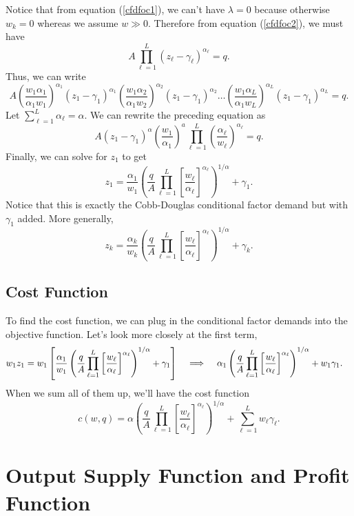 \documentclass[12pt]{article}
\newcommand{\Lindent}{\hspace{.4cm} \Longrightarrow \hspace{.4cm}}
\theoremstyle{definition}
\begin{document}
Notice that from equation (\ref{cfdfoc1}), we can't have $\lambda=0$ because otherwise $w_k=0$ whereas we assume $w \gg 0$.  Therefore from equation (\ref{cfdfoc2}), we must have
	\[	A \prod_{\ell = 1}^{L} (z_{\ell} - \gamma_{\ell})^{\alpha_{\ell}} = q. \]
Thus, we can write
	\[A \left(\frac{w_1 \alpha_1}{\alpha_1 w_1} \right)^{\alpha_1}(z_1  - \gamma_1)^{\alpha_1}\left( \frac{ w_1 \alpha_2}{\alpha_1 w_2} \right)^{\alpha_2}(z_1  - \gamma_1)^{\alpha_2} \hdots \left( \frac{ w_1 \alpha_L}{\alpha_1 w_L} \right)^{\alpha_L}(z_1  - \gamma_1)^{\alpha_L} = q.	\]
Let $\sum_{\ell=1}^L \alpha_{\ell} = \alpha$. We can rewrite the preceding equation as
	\[A (z_1 - \gamma_1)^{\alpha} \left( \frac{w_1}{\alpha_1} \right)^a \prod_{\ell=1}^L \left(\frac{\alpha_{\ell}}{w_{\ell}}\right)^{\alpha_{\ell}} = q.	\]
Finally, we can solve for $z_1$ to get 
	\[ z_1 =   \frac{\alpha_1}{w_1} \left(\frac{q}{A}  \prod_{\ell=1}^L \left[\frac{w_{\ell}}{\alpha_{\ell}}\right]^{\alpha_{\ell}}\right)^{1 / \alpha} + \gamma_1. \]
Notice that this is exactly the Cobb-Douglas conditional factor demand but with $\gamma_1$ added. More generally,
	\[ z_k =   \frac{\alpha_k}{w_k} \left(\frac{q}{A}  \prod_{\ell=1}^L \left[\frac{w_{\ell}}{\alpha_{\ell}}\right]^{\alpha_{\ell}}\right)^{1 / \alpha} + \gamma_k. \]
	
	
	
\subsection{Cost Function}
To find the cost function, we can plug in the conditional factor demands into the objective function. Let's look more closely at the first term,
\begin{align*}
	w_1 z_1 &= w_1 \left[ \frac{\alpha_1}{w_1} \left(\frac{q}{A}  \prod_{\ell=1}^L \left[\frac{w_{\ell}}{\alpha_{\ell}}\right]^{\alpha_{\ell}}\right)^{1 / \alpha} + \gamma_1\right] \Lindent \alpha_1 \left(\frac{q}{A}  \prod_{\ell=1}^L \left[\frac{w_{\ell}}{\alpha_{\ell}}\right]^{\alpha_{\ell}}\right)^{1 / \alpha} + w_1\gamma_1.
\end{align*}
When we sum all of them up, we'll have the cost function
	\[c(w,q) = \alpha  \left(\frac{q}{A}  \prod_{\ell=1}^L \left[\frac{w_{\ell}}{\alpha_{\ell}}\right]^{\alpha_{\ell}}\right)^{1 / \alpha} + \sum_{\ell=1}^L w_{\ell}\gamma_{\ell}. \]
	
	

\section{Output Supply Function and Profit Function}
\end{document}

